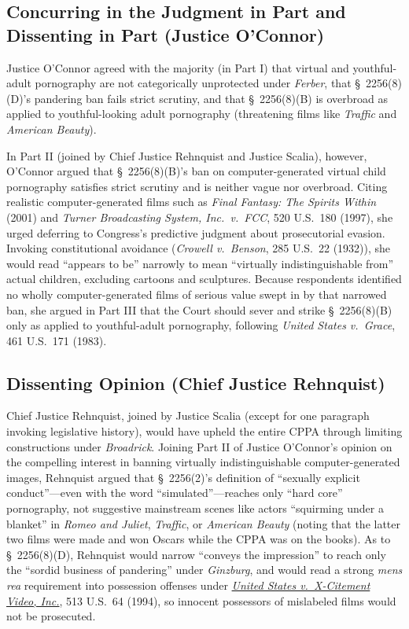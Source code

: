 \documentclass[12pt]{article}
\begin{document}
\subsection{Concurring in the Judgment in Part and Dissenting in Part (Justice O'Connor)}

Justice O'Connor agreed with the majority (in Part I) that virtual and youthful-adult pornography are not categorically unprotected under \textit{Ferber}, that \S~2256(8)(D)'s pandering ban fails strict scrutiny, and that \S~2256(8)(B) is overbroad as applied to youthful-looking adult pornography (threatening films like \textit{Traffic} and \textit{American Beauty}).

In Part II (joined by Chief Justice Rehnquist and Justice Scalia), however, O'Connor argued that \S~2256(8)(B)'s ban on computer-generated virtual child pornography satisfies strict scrutiny and is neither vague nor overbroad. Citing realistic computer-generated films such as \textit{Final Fantasy: The Spirits Within} (2001) and \textit{Turner Broadcasting System, Inc.\ v.\ FCC}, 520 U.S.\ 180 (1997), she urged deferring to Congress's predictive judgment about prosecutorial evasion. Invoking constitutional avoidance (\textit{Crowell v.\ Benson}, 285 U.S.\ 22 (1932)), she would read ``appears to be'' narrowly to mean ``virtually indistinguishable from'' actual children, excluding cartoons and sculptures. Because respondents identified no wholly computer-generated films of serious value swept in by that narrowed ban, she argued in Part III that the Court should sever and strike \S~2256(8)(B) only as applied to youthful-adult pornography, following \textit{United States v.\ Grace}, 461 U.S.\ 171 (1983).

\subsection{Dissenting Opinion (Chief Justice Rehnquist)}

Chief Justice Rehnquist, joined by Justice Scalia (except for one paragraph invoking legislative history), would have upheld the entire CPPA through limiting constructions under \textit{Broadrick}. Joining Part II of Justice O'Connor's opinion on the compelling interest in banning virtually indistinguishable computer-generated images, Rehnquist argued that \S~2256(2)'s definition of ``sexually explicit conduct''---even with the word ``simulated''---reaches only ``hard core'' pornography, not suggestive mainstream scenes like actors ``squirming under a blanket'' in \textit{Romeo and Juliet}, \textit{Traffic}, or \textit{American Beauty} (noting that the latter two films were made and won Oscars while the CPPA was on the books). As to \S~2256(8)(D), Rehnquist would narrow ``conveys the impression'' to reach only the ``sordid business of pandering'' under \textit{Ginzburg}, and would read a strong \textit{mens rea} requirement into possession offenses under \href{https://supreme.justia.com/cases/federal/us/513/64/case.pdf}{\textit{United States v.\ X-Citement Video, Inc.}}, 513 U.S.\ 64 (1994), so innocent possessors of mislabeled films would not be prosecuted.
\end{document}
